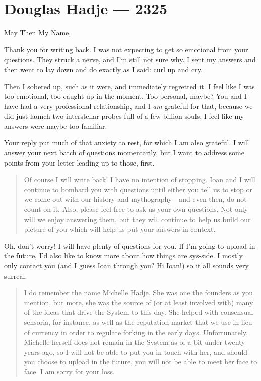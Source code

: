 \hypertarget{douglas-hadje-2325}{%
\chapter{Douglas Hadje — 2325}\label{douglas-hadje-2325}}

May Then My Name,

Thank you for writing back. I was not expecting to get so emotional from your questions. They struck a nerve, and I'm still not sure why. I sent my answers and then went to lay down and do exactly as I said: curl up and cry.

Then I sobered up, such as it were, and immediately regretted it. I feel like I was too emotional, too caught up in the moment. Too personal, maybe? You and I have had a very professional relationship, and I \emph{am} grateful for that, because we did just launch two interstellar probes full of a few billion souls. I feel like my answers were maybe too familiar.

Your reply put much of that anxiety to rest, for which I am also grateful. I will answer your next batch of questions momentarily, but I want to address some points from your letter leading up to those, first.

\begin{quote}
Of course I will write back! I have no intention of stopping. Ioan and I will continue to bombard you with questions until either you tell us to stop or we come out with our history and mythography---and even then, do not count on it. Also, please feel free to ask us your own questions. Not only will we enjoy answering them, but they will continue to help us build our picture of you which will help us put your answers in context.
\end{quote}

\noindent Oh, don't worry! I will have plenty of questions for you. If I'm going to upload in the future, I'd also like to know more about how things are sys-side. I mostly only contact you (and I guess Ioan through you? Hi Ioan!) so it all sounds very surreal.

\begin{quote}
I do remember the name Michelle Hadje. She was one the founders as you mention, but more, she was the source of (or at least involved with) many of the ideas that drive the System to this day. She helped with consensual sensoria, for instance, as well as the reputation market that we use in lieu of currency in order to regulate forking in the early days. Unfortunately, Michelle herself does not remain in the System as of a bit under twenty years ago, so I will not be able to put you in touch with her, and should you choose to upload in the future, you will not be able to meet her face to face. I am sorry for your loss.
\end{quote}

